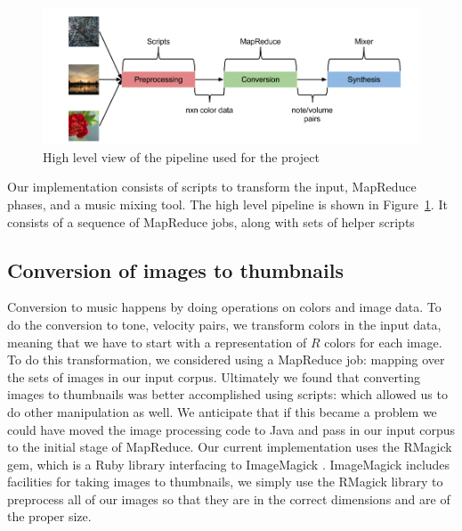 \documentclass[10pt, conference, compsocconf]{IEEEtran}
\begin{document}
\begin{figure}
  \centering
  \includegraphics[width=.85\textwidth]{pipeline.png}
  \caption{High level view of the pipeline used for the project}
  \label{fig:project-pipeline}
\end{figure}

Our implementation consists of scripts to transform the input,
MapReduce phases, and a music mixing tool.  The high level pipeline is
shown in Figure~\ref{fig:project-pipeline}.  It consists of a sequence
of MapReduce jobs, along with sets of helper scripts 

\subsection{Conversion of images to thumbnails}

Conversion to music happens by doing operations on colors and image
data.  To do the conversion to tone, velocity pairs, we transform
colors in the input data, meaning that we have to start with a
representation of $R$ colors for each image.  To do this
transformation, we considered using a MapReduce job: mapping over the
sets of images in our input corpus.  Ultimately we found that
converting images to thumbnails was better accomplished using scripts:
which allowed us to do other manipulation as well.  We anticipate that
if this became a problem we could have moved the image processing code
to Java and pass in our input corpus to the initial stage of
MapReduce.  Our current implementation uses the RMagick \cite{rmagick}
gem, which is a Ruby library interfacing to ImageMagick
\cite{imagemagick}.  ImageMagick includes facilities for taking images
to thumbnails, we simply use the RMagick library to preprocess all of
our images so that they are in the correct dimensions and are of the
proper size.


\end{document}
